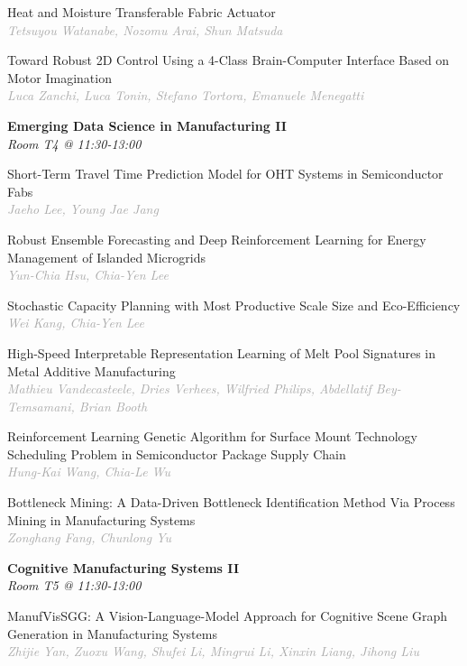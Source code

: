 \begin{multicols*}{2}
\small Heat and Moisture Transferable Fabric Actuator\\ 
\footnotesize \textcolor{darkgray}{\textit{Tetsuyou Watanabe, Nozomu  Arai, Shun  Matsuda}}

\small Toward Robust 2D Control Using a 4-Class Brain-Computer Interface Based on Motor Imagination\\ 
\footnotesize \textcolor{darkgray}{\textit{Luca Zanchi, Luca  Tonin, Stefano  Tortora, Emanuele  Menegatti}}

\normalsize \textbf{Emerging Data Science in Manufacturing II}\\
\small \textit{Room T4 @ 11:30-13:00}

\small Short-Term Travel Time Prediction Model for OHT Systems in Semiconductor Fabs\\ 
\footnotesize \textcolor{darkgray}{\textit{Jaeho Lee, Young Jae  Jang}}

\small Robust Ensemble Forecasting and Deep Reinforcement Learning for Energy Management of Islanded Microgrids\\ 
\footnotesize \textcolor{darkgray}{\textit{Yun-Chia Hsu, Chia-Yen  Lee}}

\small Stochastic Capacity Planning with Most Productive Scale Size and Eco-Efficiency\\ 
\footnotesize \textcolor{darkgray}{\textit{Wei Kang, Chia-Yen  Lee}}

\small High-Speed Interpretable Representation Learning of Melt Pool Signatures in Metal Additive Manufacturing\\ 
\footnotesize \textcolor{darkgray}{\textit{Mathieu Vandecasteele, Dries  Verhees, Wilfried  Philips, Abdellatif  Bey-Temsamani, Brian  Booth}}

\small Reinforcement Learning Genetic Algorithm for Surface Mount Technology Scheduling Problem in Semiconductor Package Supply Chain\\ 
\footnotesize \textcolor{darkgray}{\textit{Hung-Kai Wang, Chia-Le  Wu}}

\small Bottleneck Mining: A Data-Driven Bottleneck Identification Method Via Process Mining in Manufacturing Systems\\ 
\footnotesize \textcolor{darkgray}{\textit{Zonghang Fang, Chunlong  Yu}}

\normalsize \textbf{Cognitive Manufacturing Systems II}\\
\small \textit{Room T5 @ 11:30-13:00}

\small ManufVisSGG: A Vision-Language-Model Approach for Cognitive Scene Graph Generation in Manufacturing Systems\\ 
\footnotesize \textcolor{darkgray}{\textit{Zhijie Yan, Zuoxu  Wang, Shufei  Li, Mingrui  Li, Xinxin  Liang, Jihong  Liu}}


\end{multicols*}
